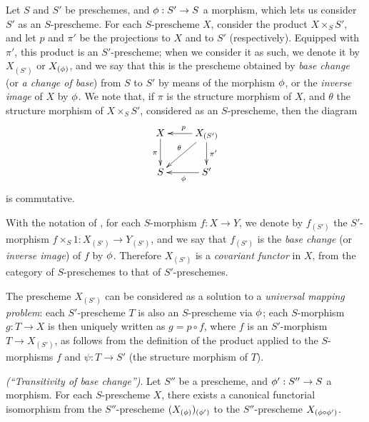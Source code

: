 \begin{env}[3.3.6]
\label{1.3.3.6}
Let $S$ and $S'$ be preschemes, and $\vphi:S'\to S$ a morphism, which lets us consider $S'$ as an
$S$-prescheme. For each $S$-prescheme $X$, consider the product $X\times_S S'$,
and let $p$ and $\pi'$ be the projections to $X$ and to $S'$ (respectively). Equipped
with $\pi'$, this product is an $S'$-prescheme; when we consider it as such, we
denote it by $X_{(S')}$ or $X_{(\phi)}$, and we say that this is the prescheme
obtained by \emph{base change} (or \emph{a change of base}) from $S$ to $S'$ by means of the morphism
$\phi$, or the \emph{inverse image} of $X$ by $\phi$. We note that, if $\pi$ is
the structure morphism of $X$, and $\theta$ the structure morphism of
$X\times_S S'$, considered as an $S$-prescheme, then the diagram
\[
  \xymatrix{
    X\ar[d]_\pi &
    X_{(S')}\ar[l]_p\ar[ld]_\theta\ar[d]^{\pi'}\\
    S &
    S'\ar[l]^\vphi
  }
\]
is commutative.
\end{env}

\begin{env}[3.3.7]
\label{1.3.3.7}
With the notation of , for each $S$-morphism $f:X\to Y$, we
denote by $f_{(S')}$ the $S'$-morphism $f\times_S 1:X_{(S')}\to Y_{(S')}$, and
we say that $f_{(S')}$ is the \emph{base change} (or \emph{inverse image}) of
$f$ by $\phi$. Therefore $X_{(S')}$ is a \emph{covariant functor} in $X$, from
the category of $S$-preschemes to that of $S'$-preschemes.
\end{env}

\begin{env}[3.3.8]
\label{1.3.3.8}
The prescheme $X_{(S')}$ can be considered as a solution to a \emph{universal
mapping problem}: each $S'$-prescheme $T$ is also an $S$-prescheme via $\phi$;
each $S$-morphism $g:T\to X$ is then uniquely written as $g=p\circ f$, where $f$
is an $S'$-morphism $T\to X_{(S')}$, as follows from the definition of the
product applied to the $S$-morphisms $f$ and $\psi:T\to S'$ (the structure
morphism of $T$).
\end{env}

\begin{prop}[3.3.9]
\label{1.3.3.9}
\emph{(``Transitivity of base change'')}. Let $S''$ be a prescheme, and
$\vphi':S''\to S$ a morphism. For each $S$-prescheme $X$, there exists a
canonical functorial isomorphism from the $S''$-prescheme
$(X_{(\phi)})_{(\phi')}$ to the $S''$-prescheme $X_{(\phi\circ\phi')}$.
\end{prop}

